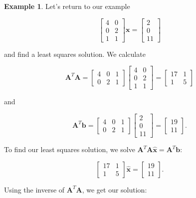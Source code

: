 \documentclass[
]{book}
\theoremstyle{definition}
\theoremstyle{definition}
\newtheorem{example}{Example}[chapter]
\theoremstyle{definition}
\theoremstyle{definition}
\theoremstyle{remark}
\begin{document}
\begin{examplebox}

\begin{example}
\protect\hypertarget{exm:ls1}{}\label{exm:ls1}Let's return to our example

\[\begin{bmatrix}4 & 0\\0 & 2\\ 1& 1\end{bmatrix}\mathbf{x}=\begin{bmatrix}2\\0\\11\end{bmatrix}\]

and find a least squares solution. We calculate

\[\mathbf{A}^T\mathbf{A}=\begin{bmatrix}4 & 0 & 1\\0 & 2 & 1\end{bmatrix}\begin{bmatrix}4 & 0\\0 & 2\\ 1& 1\end{bmatrix}=\begin{bmatrix}17 & 1\\1 & 5\end{bmatrix}\]

and

\[\mathbf{A}^T\mathbf{b}=\begin{bmatrix}4 & 0 & 1\\0 & 2 & 1\end{bmatrix}\begin{bmatrix}2\\0\\11\end{bmatrix}=\begin{bmatrix}19\\11\end{bmatrix}.\]

To find our least squares solution, we solve
\(\mathbf{A}^T\mathbf{A}\hat{\mathbf{x}}=\mathbf{A}^T\mathbf{b}\):

\[\begin{bmatrix}17 & 1\\1 & 5\end{bmatrix}\hat{\mathbf{x}}=\begin{bmatrix}19\\11\end{bmatrix}.\]

Using the inverse of \(\mathbf{A}^T\mathbf{A}\), we get our solution:


\end{example}
\end{examplebox}
\end{document}
